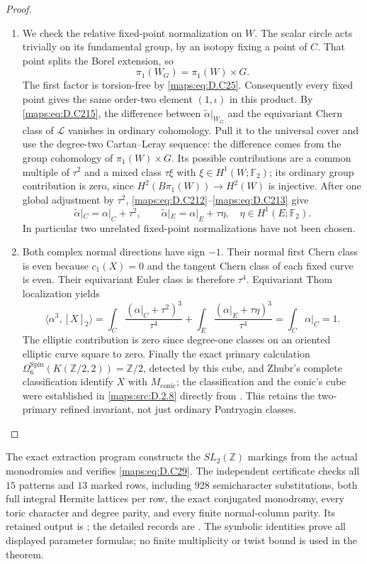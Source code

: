 \begin{proof}
\begin{enumerate}[label=\arabic*.,leftmargin=*]
\item We check the relative fixed-point normalization on $W$. The scalar
circle acts trivially on its fundamental group, by an isotopy fixing
a point of $C$. That point splits the Borel extension, so
\[
                 \pi_1(W_G)=\pi_1(W)\times G.
\]
The first factor is torsion-free by \eqref{maps:eq:D.C25}. Consequently every fixed
point gives the same order-two element $(1,\iota)$ in this product.
By \eqref{maps:eq:D.C215}, the difference between $\widetilde\alpha|_{W_G}$ and
the equivariant Chern class of $\mathcal L$ vanishes in ordinary
cohomology. Pull it to the universal cover and use the degree-two
Cartan--Leray sequence: the difference comes from the group cohomology
of $\pi_1(W)\times G$. Its possible contributions are a common
multiple of $\tau^2$ and a mixed class $\tau\xi$ with
$\xi\in H^1(W;\mathbb F_2)$; its ordinary group contribution is
zero, since $H^2(B\pi_1(W))\to H^2(W)$ is injective. After one global
adjustment by $\tau^2$, \eqref{maps:eq:D.C212}--\eqref{maps:eq:D.C213} give
\[
 \widetilde\alpha|_C=\alpha|_C+\tau^2,
 \qquad \widetilde\alpha|_E=\alpha|_E+\tau\eta,
       \quad\eta\in H^1(E;\mathbb F_2).                       \tag{D.C216}\label{maps:eq:D.C216}
\]
In particular two unrelated fixed-point normalizations have not been
chosen.

\item Both complex normal directions have sign $-1$. Their normal first
Chern class is even because $c_1(X)=0$ and the tangent Chern class of
each fixed curve is even. Their equivariant Euler class is therefore
$\tau^4$. Equivariant Thom localization yields
\[
 \langle\alpha^3,[X]_2\rangle
 =\int_C\frac{(\alpha|_C+\tau^2)^3}{\tau^4}
  +\int_E\frac{(\alpha|_E+\tau\eta)^3}{\tau^4}
 =\int_C\alpha|_C=1.
\]
The elliptic contribution is zero since degree-one classes on an
oriented elliptic curve square to zero. Finally the exact primary
calculation
$\Omega^{\mathrm{Spin}}_6(K(\mathbb Z/2,2))=\mathbb Z/2$,
detected by this cube, and Zhubr's complete classification identify
$X$ with $M_{\mathrm{conic}}$; the classification and the conic's cube
were established in \ref{maps:src:D.2.8} directly from
\cite[Theorems 3, 2.10 and Section 3.12]{manZhubr75}.
This retains the two-primary refined invariant, not just ordinary
Pontryagin classes.
\end{enumerate}
\end{proof}

The exact extraction program 
constructs the $SL_2(\mathbb Z)$ markings from the actual monodromies
and verifies \eqref{maps:eq:D.C29}. The independent certificate
checks all $15$ patterns and $13$ marked rows, including $928$
semicharacter substitutions, both full integral Hermite lattices per
row, the exact conjugated monodromy, every toric character and degree
parity, and every finite normal-column parity. Its retained output is
; the detailed records are
. The symbolic identities prove
all displayed parameter formulas; no finite multiplicity or twist
bound is used in the theorem.


